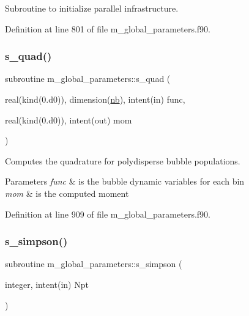 Subroutine to initialize parallel infrastructure. 



Definition at line 801 of file m\+\_\+global\+\_\+parameters.\+f90.

\mbox{\label{namespacem__global__parameters_aa5a48fa9cc196136634022cfa6708213}} 
\subsubsection{\texorpdfstring{s\+\_\+quad()}{s\_quad()}}
{\footnotesize\ttfamily subroutine m\+\_\+global\+\_\+parameters\+::s\+\_\+quad (\begin{DoxyParamCaption}\item[{real(kind(0.d0)), dimension(\hyperlink{namespacem__global__parameters_ad76c4758994b52559f478d251dc0cba5}{nb}), intent(in)}]{func,  }\item[{real(kind(0.d0)), intent(out)}]{mom }\end{DoxyParamCaption})}



Computes the quadrature for polydisperse bubble populations. 


\begin{DoxyParams}{Parameters}
{\em func} & is the bubble dynamic variables for each bin \\
\hline
{\em mom} & is the computed moment \\
\hline
\end{DoxyParams}


Definition at line 909 of file m\+\_\+global\+\_\+parameters.\+f90.

\mbox{\label{namespacem__global__parameters_a78f4bf8bb59af4396bf11aca330463ec}} 
\subsubsection{\texorpdfstring{s\+\_\+simpson()}{s\_simpson()}}
{\footnotesize\ttfamily subroutine m\+\_\+global\+\_\+parameters\+::s\+\_\+simpson (\begin{DoxyParamCaption}\item[{integer, intent(in)}]{Npt }\end{DoxyParamCaption})}



